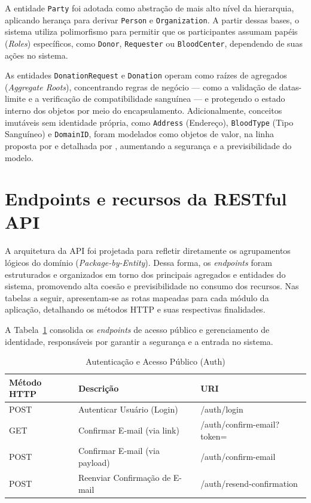 A entidade \texttt{Party} foi adotada como abstração de mais alto nível da hierarquia, aplicando herança para derivar \texttt{Person} e \texttt{Organization}. A partir dessas bases, o sistema utiliza polimorfismo para permitir que os participantes assumam papéis (\textit{Roles}) específicos, como \texttt{Donor}, \texttt{Requester} ou \texttt{BloodCenter}, dependendo de suas ações no sistema.

As entidades \texttt{DonationRequest} e \texttt{Donation} operam como raízes de agregados (\textit{Aggregate Roots}), concentrando regras de negócio --- como a validação de datas-limite e a verificação de compatibilidade sanguínea --- e protegendo o estado interno dos objetos por meio do encapsulamento. Adicionalmente, conceitos imutáveis sem identidade própria, como \texttt{Address} (Endereço), \texttt{BloodType} (Tipo Sanguíneo) e \texttt{DomainID}, foram modelados como objetos de valor, na linha proposta por  e detalhada por , aumentando a segurança e a previsibilidade do modelo.

\section{Endpoints e recursos da RESTful API}
\label{sec:endpoints-api}

A arquitetura da API foi projetada para refletir diretamente os agrupamentos lógicos do domínio (\textit{Package-by-Entity}). Dessa forma, os \textit{endpoints} foram estruturados e organizados em torno dos principais agregados e entidades do sistema, promovendo alta coesão e previsibilidade no consumo dos recursos. Nas tabelas a seguir, apresentam-se as rotas mapeadas para cada módulo da aplicação, detalhando os métodos HTTP e suas respectivas finalidades.

A Tabela~\ref{tab:auth-endpoints} consolida os \textit{endpoints} de acesso público e gerenciamento de identidade, responsáveis por garantir a segurança e a entrada no sistema.

\begin{table}[H]
  \centering
  \caption{Autenticação e Acesso Público (Auth)}
  \label{tab:auth-endpoints}
  \begin{tabularx}{\textwidth}{>{\raggedright\arraybackslash}p{2.5cm} >{\raggedright\arraybackslash}X >{\ttfamily\raggedright\arraybackslash}p{6cm}}
    \toprule
    \textbf{Método HTTP} & \textbf{Descrição} & \textbf{URI} \\
    \midrule
    POST & Autenticar Usuário (Login) & /auth/login \\
    GET & Confirmar E-mail (via link) & /auth/confirm-email?token= \\
    POST & Confirmar E-mail (via payload) & /auth/confirm-email \\
    POST & Reenviar Confirmação de E-mail & /auth/resend-confirmation \\
    \bottomrule
  \end{tabularx}
\end{table}

